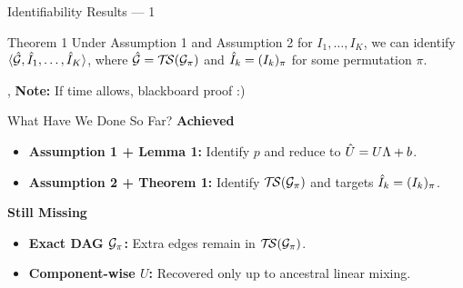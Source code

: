 \begin{frame}{Identifiability Results --- 1}
  \vspace{1ex}
  \begin{statement}{Theorem 1}
    Under Assumption 1 and Assumption 2 for $I_1,\dots,I_K$, we can identify $\langle \hat{\mathcal{G}}, \hat{I}_1,\dots,\hat{I}_K\rangle$, where $\hat{\mathcal{G}} = \mathcal{T}\!\mathcal{S}(\mathcal{G}_\pi)$ and $\hat{I}_k = (I_k)_\pi$ for some permutation $\pi$.
  \end{statement}
  \sep
  \textbf{Note:} If time allows, blackboard proof :)
\end{frame}

\begin{frame}{What Have We Done So Far?}
  \vspace{2ex}
  \textbf{Achieved}
  \begin{itemize}
    \item \textbf{Assumption 1 + Lemma 1:} Identify $p$ and reduce to $\hat{U} = U\Lambda + b$.
    \item \textbf{Assumption 2 + Theorem 1:} Identify $\mathcal{T}\!\mathcal{S}(\mathcal{G}_\pi)$ and targets $\hat{I}_k = (I_k)_\pi$.
  \end{itemize}
  \vspace{1.5ex}
  \textbf{Still Missing}
  \begin{itemize}
    \item \textbf{Exact DAG $\mathcal{G}_\pi$:} Extra edges remain in $\mathcal{T}\!\mathcal{S}(\mathcal{G}_\pi)$.
    \item \textbf{Component-wise $U$:} Recovered only up to ancestral linear mixing.
  \end{itemize}
\end{frame}

